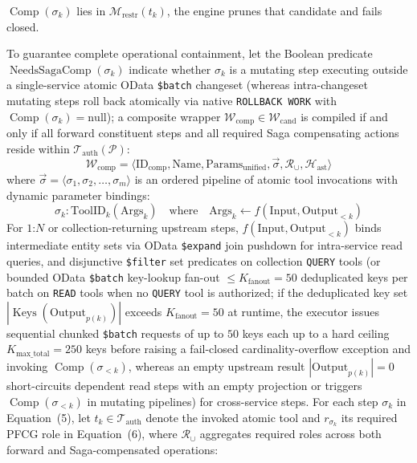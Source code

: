 \documentclass[conference,10pt]{IEEEtran}
\begin{document}
$\operatorname{Comp}(\sigma_k)$ lies in $\mathcal{M}_{\text{restr}}(t_k)$, the engine prunes that candidate and fails closed.

To guarantee complete operational containment, let the Boolean predicate $\operatorname{NeedsSagaComp}(\sigma_k)$ indicate whether $\sigma_k$ is a mutating step executing outside a single-service atomic OData \texttt{\$batch} changeset (whereas intra-changeset mutating steps roll back atomically via native \texttt{ROLLBACK WORK} with $\operatorname{Comp}(\sigma_k) = \text{null}$); a composite wrapper $\mathcal{W}_{\text{comp}} \in \mathcal{W}_{\text{cand}}$ is compiled if and only if all forward constituent steps and all required Saga compensating actions reside within $\mathcal{T}_{\text{auth}}(\mathcal{P})$:
\begin{equation}
\mathcal{W}_{\text{comp}} = \langle \text{ID}_{\text{comp}}, \text{Name}, \text{Params}_{\text{unified}}, \vec{\sigma}, \mathcal{R}_{\cup}, \mathcal{H}_{\text{ast}} \rangle
\end{equation}
where $\vec{\sigma} = \langle \sigma_1, \sigma_2, \dots, \sigma_m \rangle$ is an ordered pipeline of atomic tool invocations with dynamic parameter bindings:
\begin{equation}
\sigma_k : \text{ToolID}_k(\text{Args}_k) \quad \text{where} \quad \text{Args}_k \leftarrow f(\text{Input}, \text{Output}_{<k})
\end{equation}
For $1\text{:}N$ or collection-returning upstream steps, $f(\text{Input}, \text{Output}_{<k})$ binds intermediate entity sets via OData \texttt{\$expand} join pushdown for intra-service read queries, and disjunctive \texttt{\$filter} set predicates on collection \texttt{QUERY} tools (or bounded OData \texttt{\$batch} key-lookup fan-out $\le K_{\text{fanout}} = 50$ deduplicated keys per batch on \texttt{READ} tools when no \texttt{QUERY} tool is authorized; if the deduplicated key set $|\operatorname{Keys}(\text{Output}_{p(k)})|$ exceeds $K_{\text{fanout}} = 50$ at runtime, the executor issues sequential chunked \texttt{\$batch} requests of up to $50$ keys each up to a hard ceiling $K_{\text{max\_total}} = 250$ keys before raising a fail-closed cardinality-overflow exception and invoking $\operatorname{Comp}(\sigma_{<k})$, whereas an empty upstream result $|\text{Output}_{p(k)}| = 0$ short-circuits dependent read steps with an empty projection or triggers $\operatorname{Comp}(\sigma_{<k})$ in mutating pipelines) for cross-service steps. For each step $\sigma_k$ in Equation~(5), let $t_k \in \mathcal{T}_{\text{auth}}$ denote the invoked atomic tool and $r_{\sigma_k}$ its required PFCG role in Equation~(6), where $\mathcal{R}_{\cup}$ aggregates required roles across both forward and Saga-compensated operations:
\end{document}

